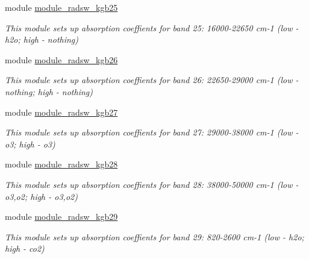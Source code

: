 \begin{DoxyCompactItemize}
module \hyperlink{namespacemodule__radsw__kgb25}{module\+\_\+radsw\+\_\+kgb25}
\begin{DoxyCompactList}\small\item\em This module sets up absorption coeffients for band 25\+: 16000-\/22650 cm-\/1 (low -\/ h2o; high -\/ nothing) \end{DoxyCompactList}\item 
module \hyperlink{namespacemodule__radsw__kgb26}{module\+\_\+radsw\+\_\+kgb26}
\begin{DoxyCompactList}\small\item\em This module sets up absorption coeffients for band 26\+: 22650-\/29000 cm-\/1 (low -\/ nothing; high -\/ nothing) \end{DoxyCompactList}\item 
module \hyperlink{namespacemodule__radsw__kgb27}{module\+\_\+radsw\+\_\+kgb27}
\begin{DoxyCompactList}\small\item\em This module sets up absorption coeffients for band 27\+: 29000-\/38000 cm-\/1 (low -\/ o3; high -\/ o3) \end{DoxyCompactList}\item 
module \hyperlink{namespacemodule__radsw__kgb28}{module\+\_\+radsw\+\_\+kgb28}
\begin{DoxyCompactList}\small\item\em This module sets up absorption coeffients for band 28\+: 38000-\/50000 cm-\/1 (low -\/ o3,o2; high -\/ o3,o2) \end{DoxyCompactList}\item 
module \hyperlink{namespacemodule__radsw__kgb29}{module\+\_\+radsw\+\_\+kgb29}
\begin{DoxyCompactList}\small\item\em This module sets up absorption coeffients for band 29\+: 820-\/2600 cm-\/1 (low -\/ h2o; high -\/ co2) \end{DoxyCompactList}\end{DoxyCompactItemize}
